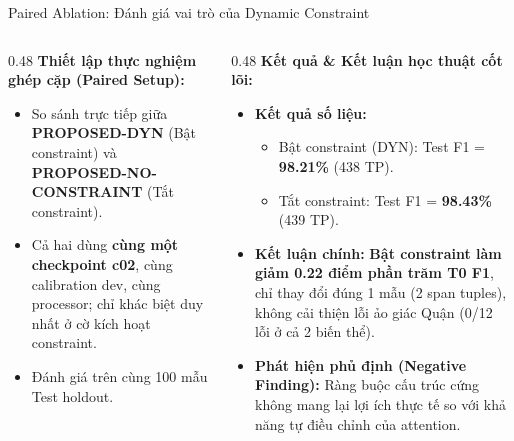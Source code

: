 \documentclass[aspectratio=169, 9pt]{beamer}
\begin{document}
\begin{frame}{Paired Ablation: Đánh giá vai trò của Dynamic Constraint}
  \vspace{-0.15cm}
  \begin{columns}[T]
    \begin{column}{0.48\textwidth}
      \textbf{Thiết lập thực nghiệm ghép cặp (Paired Setup):}
      \begin{itemize}
        \setlength{\itemsep}{2.5pt}
        \item So sánh trực tiếp giữa \textbf{PROPOSED-DYN} (Bật constraint) và \textbf{PROPOSED-NO-CONSTRAINT} (Tắt constraint).
        \item Cả hai dùng \textbf{cùng một checkpoint c02}, cùng calibration dev, cùng processor; chỉ khác biệt duy nhất ở cờ kích hoạt constraint.
        \item Đánh giá trên cùng 100 mẫu Test holdout.
      \end{itemize}
    \end{column}
    \begin{column}{0.48\textwidth}
      \textbf{Kết quả \& Kết luận học thuật cốt lõi:}
      \begin{itemize}
        \setlength{\itemsep}{2.5pt}
        \item \textbf{Kết quả số liệu:}
        \begin{itemize}
          \setlength{\itemsep}{1.5pt}
          \item Bật constraint (DYN): Test F1 = \textbf{98.21\%} (438 TP).
          \item Tắt constraint: Test F1 = \textbf{98.43\%} (439 TP).
        \end{itemize}
        \item \textbf{Kết luận chính:} \textbf{Bật constraint làm giảm 0.22 điểm phần trăm T0 F1}, chỉ thay đổi đúng 1 mẫu (2 span tuples), không cải thiện lỗi ảo giác Quận (0/12 lỗi ở cả 2 biến thể).
        \item \textbf{Phát hiện phủ định (Negative Finding):} Ràng buộc cấu trúc cứng không mang lại lợi ích thực tế so với khả năng tự điều chỉnh của attention.
      \end{itemize}
    \end{column}
  \end{columns}
\end{frame}
\end{document}
